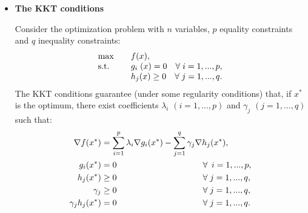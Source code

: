 \documentclass{../ape}
\begin{document}
\begin{itemize}[leftmargin=*]
\renewcommand{\labelitemi}{$\bullet$}

	\item \textbf{The KKT conditions}
	\vspace{.3cm}
	
	Consider the optimization problem with $n$ variables, $p$ equality constraints and $q$ inequality constraints:
	\begin{equation*}
		\begin{array}{lll}
			\max && f(x), \\ 
			\mbox{s.t.} && g_i \hspace{.1cm} (x) = 0 \quad \forall \; i = 1, ..., p, \\
			&& h_j(x) \geq 0 \quad \forall \; j = 1, ..., q.
		\end{array}
	\end{equation*}
	The KKT conditions guarantee (under some regularity conditions) that, if $x^*$ is the optimum, there exist coefficients $\lambda_i$ $(i = 1, ..., p)$ and $\gamma_j$ $(j = 1, ..., q)$ such that:
	\begin{align*}
		\nabla f(x^*) & = \sum_{i = 1}^p \lambda_i \nabla g_i(x^*) - \sum_{j = 1}^q \gamma_j \nabla h_j(x^*), \\
		g_i(x^*) & = 0 \hspace{3.58cm} \forall \hspace{.07cm} \; i = 1, ..., p, \\
		h_j(x^*) & \geq 0 \hspace{3.58cm} \forall \; j = 1, ..., q, \\
		\gamma_j & \geq 0 \hspace{3.58cm} \forall \; j = 1, ..., q, \\
		\gamma_j h_j(x^*) & = 0 \hspace{3.58cm} \forall \; j = 1, ..., q.
	\end{align*}
		
\end{itemize}
\end{document}
